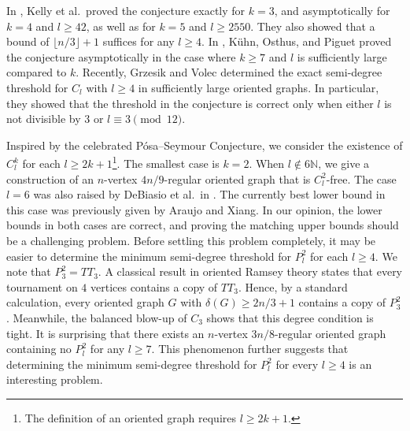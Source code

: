 \documentclass[11pt,a4paper,reqno]{amsart}
\theoremstyle{definition} %
\begin{document}
In \cite{kellyJCTB100}, Kelly et al.\ proved the conjecture exactly for $k=3$, and asymptotically for $k=4$ and $l\geqslant 42$, as well as for $k=5$ and $l\geqslant 2550$. They also showed that a bound of $\lfloor n/3\rfloor+1$ suffices for any $l\geqslant 4$. In \cite{kuhnEJC34}, K\"uhn, Osthus, and Piguet proved the conjecture asymptotically in the case where $k\geqslant 7$ and $l$ is sufficiently large compared to $k$. Recently, Grzesik and Volec \cite{rzesikIMRN2023} determined the exact semi-degree threshold for $C_l$ with $l\geqslant 4$ in sufficiently large oriented graphs. In particular, they showed that the threshold in the conjecture is correct only when either $l$ is not divisible by $3$ or $l\equiv 3 \pmod{12}$.

Inspired by the celebrated P\'osa--Seymour Conjecture, we consider the existence of $C_l^k$ for each $l\geqslant 2k+1$\footnote{The definition of an oriented graph requires $l\geqslant 2k+1$.}. The smallest case is $k=2$. When $l\notin 6\mathbb{N}$, we give a construction of an $n$-vertex $4n/9$-regular oriented graph that is $C_l^2$-free.  The case $l=6$ was also raised by DeBiasio et al.\ in \cite{debiasioCPC35}. The currently best lower bound in this case was previously given by Araujo and Xiang. In our opinion, the lower bounds in both cases are correct, and proving the matching upper bounds should be a challenging problem. Before settling this problem completely, it may be easier to determine the minimum semi-degree threshold for $P_l^2$ for each $l\geqslant 4$. We note that $P_3^2=TT_3$. A classical result in oriented Ramsey theory states that every tournament on $4$ vertices contains a copy of $TT_3$. Hence, by a standard calculation, every oriented graph $G$ with $\delta(G)\geqslant 2n/3+1$ contains a copy of $P_3^2$. Meanwhile, the balanced blow-up of $C_3$ shows that this degree condition is tight. It is surprising that there exists an $n$-vertex $3n/8$-regular oriented graph containing no $P_l^2$ for any $l\geqslant 7$. This phenomenon further suggests that determining the minimum semi-degree threshold for $P_l^2$ for every $l\geqslant 4$ is an interesting problem.
\end{document}
